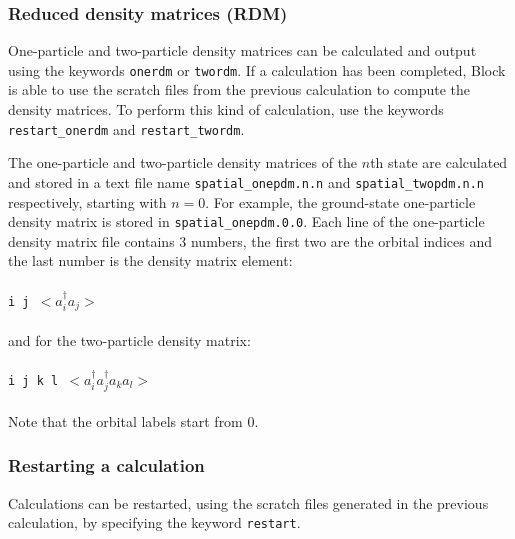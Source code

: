 \documentclass[letterpaper,12pt,aps, pra]{revtex4-1}
\begin{document}
\subsubsection{Reduced density matrices (RDM)}
One-particle and two-particle density matrices can be calculated and output
using the keywords \texttt{onerdm} or \texttt{twordm}.  If a calculation has
been completed, Block is able to use the scratch files from the previous
calculation to compute the density matrices. To perform this kind of
calculation,  use the keywords \texttt{restart\_onerdm} and
\texttt{restart\_twordm}.

The one-particle and two-particle density matrices of the $n$th state are
calculated and stored in a text file name \texttt{spatial\_onepdm.n.n} and
\texttt{spatial\_twopdm.n.n} respectively, starting with $n=0$. For example,
the ground-state one-particle density matrix is stored in
\texttt{spatial\_onepdm.0.0}.  Each line of the one-particle density matrix
file contains 3 numbers, the first two are the orbital indices and the last
number is the density matrix element:
\\ \texttt{ \\i j $<a_i^\dag a_j>$\\ }
\\and for the two-particle density matrix:
\\ \texttt{ \\i j k l $<a_i^\dag
a_j^\dag a_k a_l>$\\ } 
\\Note that the orbital labels start from 0.

\subsubsection{Restarting a calculation}
Calculations can be restarted, using the scratch files generated in the
previous calculation, by specifying the keyword \texttt{restart}.
\end{document}
